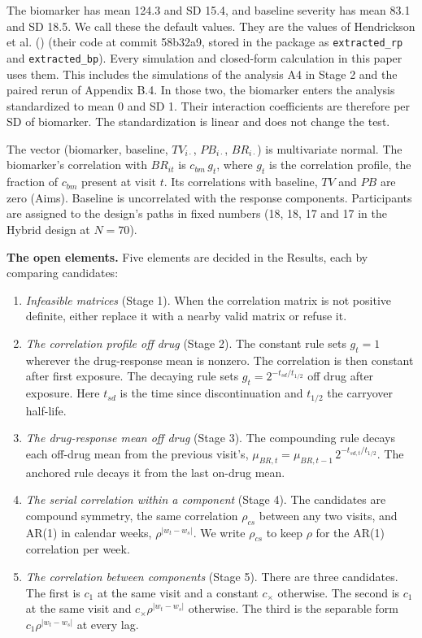 \documentclass[
  11pt,
]{article}
\providecommand{\tightlist}{%
  \setlength{\itemsep}{0pt}\setlength{\parskip}{0pt}}
\begin{document}
The biomarker has mean 124.3 and SD 15.4, and baseline severity has
mean 83.1 and SD 18.5. We call these the default values. They are the
values of Hendrickson et al. () (their code at commit
58b32a9, stored in the package as \texttt{extracted\_rp} and
\texttt{extracted\_bp}). Every simulation and closed-form calculation in this
paper uses them. This includes the simulations of the analysis A4 in
Stage 2 and the paired rerun of Appendix B.4. In those two, the
biomarker enters the analysis standardized to mean 0 and SD 1. Their
interaction coefficients are therefore per SD of biomarker. The
standardization is linear and does not change the test.

The vector (biomarker, baseline, \(TV_{i\cdot}\), \(PB_{i\cdot}\),
\(BR_{i\cdot}\)) is multivariate normal. The biomarker's correlation
with \(BR_{it}\) is \(c_{bm}\,g_t\), where \(g_t\) is the correlation
profile, the fraction of \(c_{bm}\) present at visit \(t\). Its
correlations with baseline, \(TV\) and \(PB\) are zero (Aims). Baseline is
uncorrelated with the response components. Participants are assigned
to the design's paths in fixed numbers (18, 18, 17 and 17 in the Hybrid
design at \(N = 70\)).

\textbf{The open elements.} Five elements are decided in the Results, each
by comparing candidates:

\begin{enumerate}
\def\labelenumi{\arabic{enumi}.}
\tightlist
\item
  \emph{Infeasible matrices} (Stage 1). When the correlation matrix is not
  positive definite, either replace it with a nearby valid matrix or
  refuse it.
\item
  \emph{The correlation profile off drug} (Stage 2). The constant rule sets
  \(g_t = 1\) wherever the drug-response mean is nonzero. The
  correlation is then constant after first exposure. The decaying
  rule sets \(g_t = 2^{-t_{sd}/t_{1/2}}\) off drug after exposure. Here
  \(t_{sd}\) is the time since discontinuation and \(t_{1/2}\) the
  carryover half-life.
\item
  \emph{The drug-response mean off drug} (Stage 3). The compounding rule
  decays each off-drug mean from the previous visit's,
  \(\mu_{BR,t} = \mu_{BR,t-1}\, 2^{-t_{sd,t}/t_{1/2}}\). The anchored
  rule decays it from the last on-drug mean.
\item
  \emph{The serial correlation within a component} (Stage 4). The
  candidates are compound symmetry, the same correlation \(\rho_{cs}\)
  between any two visits, and AR(1) in calendar weeks,
  \(\rho^{\lvert w_t - w_s\rvert}\). We write \(\rho_{cs}\) to keep \(\rho\)
  for the AR(1) correlation per week.
\item
  \emph{The correlation between components} (Stage 5). There are three
  candidates. The first is \(c_1\) at the same visit and a constant
  \(c_\times\) otherwise. The second is \(c_1\) at the same visit and
  \(c_\times\rho^{\lvert w_t - w_s\rvert}\) otherwise. The third is the
  separable form \(c_1\rho^{\lvert w_t - w_s\rvert}\) at every lag.
\end{enumerate}
\end{document}

